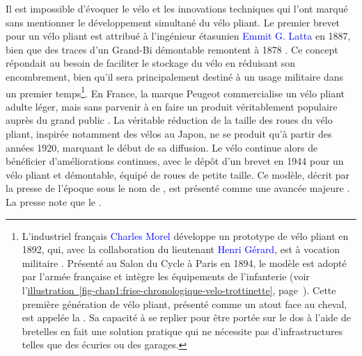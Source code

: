 \begin{refsegment}
Il est impossible d’évoquer le vélo et les innovations techniques qui l'ont marqué sans mentionner le développement simultané du vélo pliant. Le premier brevet pour un vélo pliant est attribué à l’ingénieur étasunien \textcolor{blue}{Emmit G. Latta} en 1887, bien que des traces d’un Grand-Bi démontable remontent à 1878 \textcolor{blue}{\autocite{the_folding_cyclist_history_2010}}. Ce concept répondait au besoin de faciliter le stockage du vélo en réduisant son encombrement, bien qu'il sera principalement destiné à un usage militaire dans un premier temps\footnote{
    L’industriel français \textcolor{blue}{Charles Morel} développe un prototype de vélo pliant en 1892, qui, avec la collaboration du lieutenant \textcolor{blue}{Henri Gérard}, est à vocation militaire \textcolor{blue}{\autocite{the_folding_cyclist_history_2010}}. Présenté au Salon du Cycle à Paris en 1894, le modèle  est adopté par l’armée française et intègre les équipements de l’infanterie (voir l'\hyperref[fig-chap1:frise-chronologique-velo-trottinette]{illustration~\ref{fig-chap1:frise-chronologique-velo-trottinette}}, page~\pageref{fig-chap1:frise-chronologique-velo-trottinette}). Cette première génération de vélo pliant, présenté comme un atout face au cheval, est appelée la . Sa capacité à se replier pour être portée sur le dos à l’aide de bretelles en fait une solution pratique qui ne nécessite pas d’infrastructures telles que des écuries ou des garages.
}. En France, la marque Peugeot commercialise un vélo pliant adulte léger, mais sans parvenir à en faire un produit véritablement populaire auprès du grand public \textcolor{blue}{\autocite{transportation_alternatives_folding_2013}}. La véritable réduction de la taille des roues du vélo pliant, inspirée notamment des vélos  au Japon, ne se produit qu’à partir des années 1920, marquant le début de sa diffusion. Le vélo continue alors de bénéficier d'améliorations continues, avec le dépôt d’un brevet en 1944 pour un vélo pliant et démontable, équipé de roues de petite taille. Ce modèle, décrit par la presse de l’époque sous le nom de , est présenté comme une avancée majeure \textcolor{blue}{\autocite[44]{jouenne_quest-ce_2022}}. La presse note que le   \textcolor{blue}{\autocite{the_folding_cyclist_history_2010}}.%


\end{refsegment}
